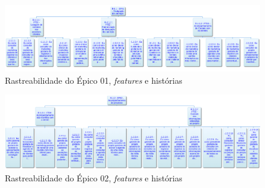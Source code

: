 \begin{figure}[!htb]
 \centering
 \includegraphics[scale= 0.5, angle=-90]{figuras/EP01.png}
 \caption{Rastreabilidade do Épico 01, \textit{features} e histórias}
 \label{rast2}
\end{figure}

\begin{figure}[!htb]
 \centering
 \includegraphics[scale= 0.5, angle=-90]{figuras/EP02.png}
 \caption{Rastreabilidade do Épico 02, \textit{features} e histórias}
 \label{rast3}
\end{figure}